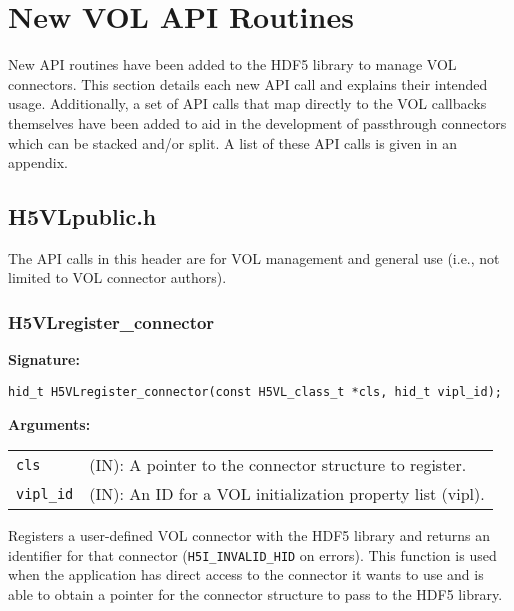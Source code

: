 \section{New VOL API Routines}
\label{sec:api}
New API routines have been added to the HDF5 library to manage VOL connectors. This section details each new API call and explains their intended usage. Additionally, a set of API calls that map directly to the VOL callbacks themselves have been added to aid in the development of passthrough connectors which can be stacked and/or split. A list of these API calls is given in an appendix.

\bigskip

\subsection{H5VLpublic.h}

The API calls in this header are for VOL management and general use (i.e., not
limited to VOL connector authors).

\subsubsection{H5VLregister\_connector}
\begin{mdframed}[style=bgbox]
\textbf{Signature:}
\begin{lstlisting}
hid_t H5VLregister_connector(const H5VL_class_t *cls, hid_t vipl_id);
\end{lstlisting}

\textbf{Arguments:}\\
\begin{tabular}{l p{13.5cm}}
  {\tt cls} & (IN): A pointer to the connector structure to register.\\
  {\tt vipl\_id} & (IN): An ID for a VOL initialization property list (vipl).\\
\end{tabular}
\end{mdframed}

Registers a user-defined VOL connector with the HDF5 library and returns an identifier for that connector (\texttt{H5I\_INVALID\_HID} on errors). This function is used when the application has direct access to the connector it wants to use and is able to obtain a pointer for the connector structure to pass to the HDF5 library.
\bigskip

